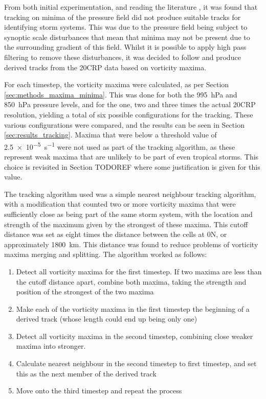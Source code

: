 \documentclass[pdftex,12pt,a4paper]{report}
\begin{document}
From both initial experimentation, and reading the literature \parencite{TODOCITEmultiple}, it was found
that tracking on minima of the pressure field did not produce suitable tracks for identifying
storm systems. This was due to the pressure field being subject to synoptic scale disturbances
that mean that minima may not be present due to the surrounding gradient of this field. Whilst it is
possible to apply high pass filtering to remove these disturbances, it was decided to follow
\textcite{TODOCITEmultiple} and produce derived tracks from the 20CRP data based on vorticity maxima.

For each timestep, the vorticity maxima were calculated, as per Section
\ref{sec:methods_maxima_minima}. This was done for both the \SI{995}{hPa} and \SI{850}{hPa} pressure
levels, and for the one, two and three times the actual 20CRP resolution, yielding a total of six
possible configurations for the tracking. These various configurations were compared, and the
results can be seen in Section \ref{sec:results_tracking}. Maxima that were below a threshold value
of \SI{2.5e-5}{s^{-1}} were not used as part of the tracking algorithm, as these represent weak maxima
that are unlikely to be part of even tropical storms. This choice is revisited in Section TODOREF where
some justification is given for this value.

The tracking algorithm used was a simple nearest neighbour tracking algorithm, with a modification
that counted two or more vorticity maxima that were sufficiently close as being part of the same storm
system, with the location and strength of the maximum given by the strongest of
these maxima. This cutoff distance was set as eight times the distance between the cells at
0\textdegree N, or approximately \SI{1800}{km}. This distance was found to reduce problems of
vorticity maxima merging and splitting. The algorithm worked as follows:

\begin{enumerate}
    \item Detect all vorticity maxima for the first timestep. If two maxima are less than the cutoff
        distance apart, combine both maxima, taking the strength and position of the strongest of
        the two maxima
    \item Make each of the vorticity maxima in the first timestep the beginning of a derived track
        (whose length could end up being only one)
    \item Detect all vorticity maxima in the second timestep, combining close weaker maxima into
        stronger. %
    \item Calculate nearest neighbour in the second timestep to first timestep, and set this as the
        next member of the derived track
    \item Move onto the third timestep and repeat the process
\end{enumerate}
\end{document}
